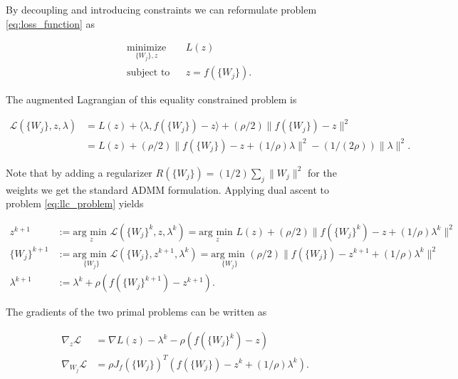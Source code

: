 \documentclass[english,11pt,a4paper]{article}
\newcommand\inner[2]{\langle #1, #2 \rangle}
\begin{document}
By decoupling and introducing constraints we can reformulate problem \ref{eq:loss_function} as

\begin{equation}
	\begin{aligned}
		& \underset{\{W_j\},z}{\text{minimize}}
		&& L(z) \\
		& \text{subject to}
		&& z = f(\{W_j\}).
	\end{aligned}
	\label{eq:llc_problem}
\end{equation}

The augmented Lagrangian of this equality constrained problem is

\begin{equation}
	\begin{aligned}
		\mathcal{L}(\{W_j\}, z, \lambda)
		&= L(z) + \inner{\lambda}{f(\{W_j\})-z} + (\rho/2)\| f(\{W_j\})-z \|^2 \\
		&= L(z) + (\rho/2) \| f(\{W_j\}) - z + (1/\rho) \lambda \|^2 - (1/(2 \rho)) \| \lambda \|^2.
	\end{aligned}
\end{equation}

Note that by adding a regularizer $R(\{W_j\}) = (1/2) \sum_{j} \| W_j \|^2$ for the weights we get the standard ADMM formulation. Applying dual ascent to problem \ref{eq:llc_problem} yields

\begin{equation}
	\begin{aligned}
		z^{k+1}
		&:= \underset{z}{\text{arg min }} \mathcal{L}(\{W_j\}^k, z, \lambda^k)
		= \underset{z}{\text{arg min }} L(z) + (\rho/2) \| f(\{W_j\}^k) - z + (1/\rho) \lambda^k \|^2 \\
		\{W_j\}^{k+1}
		&:= \underset{\{W_j\}}{\text{arg min }} \mathcal{L}(\{W_j\}, z^{k+1}, \lambda^k)
		= \underset{\{W_j\}}{\text{arg min }} (\rho/2) \| f(\{W_j\}) - z^{k+1} + (1/\rho) \lambda^k \|^2 \\
		\lambda^{k+1} &:= \lambda^k + \rho (f(\{W_j\}^{k+1})-z^{k+1}).
	\end{aligned}
\end{equation}

The gradients of the two primal problems can be written as

\begin{equation}
	\begin{aligned}
		\nabla_z \mathcal{L} &= \nabla L(z) - \lambda^k - \rho (f(\{W_j\}^k) - z) \\
		\nabla_{W_j} \mathcal{L} &= \rho J_f(\{W_j\})^T (f(\{W_j\}) - z^k + (1/\rho) \lambda^k).
	\end{aligned}
\end{equation}
\end{document}
